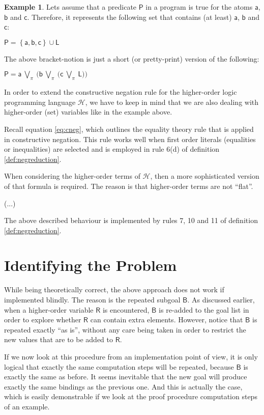 \documentclass[inscr,ack,preface]{dithesis}
\theoremstyle{definition}
\newtheorem{example}{Example}[chapter]
\newcommand{\h}{$\mathcal{H}$}
\newcommand{\msf}[1]{$\mathsf{#1}$}
\begin{document}
\begin{example} Lets assume that a predicate \msf{P} in a program is true for the atoms \msf{a}, \msf{b} and \msf{c}. Therefore, it represents the following set that contains (at least) \msf{a}, \msf{b} and \msf{c}:
\begin{center}
  \msf{P = \left\{ a, b, c \right\} \cup L}
\end{center}

The above bracket-notion is just a short (or pretty-print) version of the following:
\begin{center}
  \msf{P = a ~\bigvee_{\pi}~ \big( b ~\bigvee_{\pi}~ \big( c ~\bigvee_{\pi}~ L \big) \big)}
\end{center}

\end{example}

In order to extend the constructive negation rule for the higher-order logic programming language \h{}, we have to keep in mind that we are also dealing with higher-order (set) variables like in the example above.

Recall equation \ref{eq:cneg}, which outlines the equality theory rule that is applied in constructive negation. This rule works well when first order literals (equalities or inequalities) are selected and is employed in rule 6(d) of definition \ref{def:negreduction}.

When considering the higher-order terms of \h{}, then a more sophisticated version of that formula is required. The reason is that higher-order terms are not ``flat''.

(...)

The above described behaviour is implemented by rules 7, 10 and 11 of definition \ref{def:negreduction}.

\section{Identifying the Problem}
While being theoretically correct, the above approach does not work if implemented blindly. The reason is the repeated subgoal \msf{B}. As discussed earlier, when a higher-order variable \msf{R} is encountered, \msf{B} is re-added to the goal list in order to explore whether \msf{R} can contain extra elements. However, notice that \msf{B} is repeated exactly ``as is'', without any care being taken in order to restrict the new values that are to be added to \msf{R}.

If we now look at this procedure from an implementation point of view, it is only logical that exactly the same computation steps will be repeated, because \msf{B} is exactly the same as before. It seems inevitable that the new goal will produce exactly the same bindings as the previous one. And this is actually the case, which is easily demonstrable if we look at the proof procedure computation steps of an example.
\end{document}
